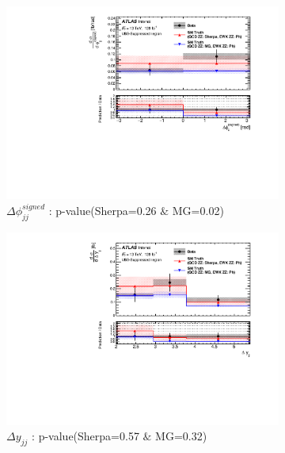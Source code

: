 \begin{figure}[!htb]
\begin{subfigure}{.49\textwidth}
        \centering
        \includegraphics[width=.98\linewidth]{figures/Results/CrossSection_VBSSuppressed/xs_dphi_CR.pdf}
        \caption{ \footnotesize{$\Delta \phi _{jj}^{signed}$ }: p-value(Sherpa=0.26 $\&$ MG=0.02)}
    \end{subfigure}
    \begin{subfigure}{.49\textwidth}
        \centering
        \includegraphics[width=.98\linewidth]{figures/Results/CrossSection_VBSSuppressed/xs_dy_CR.pdf}
        \caption{ \footnotesize{$\Delta y_{jj}$ }: p-value(Sherpa=0.57 $\&$ MG=0.32)}
    \end{subfigure}\\
    \begin{subfigure}{.49\textwidth}
        \centering

\end{subfigure}
\end{figure}
